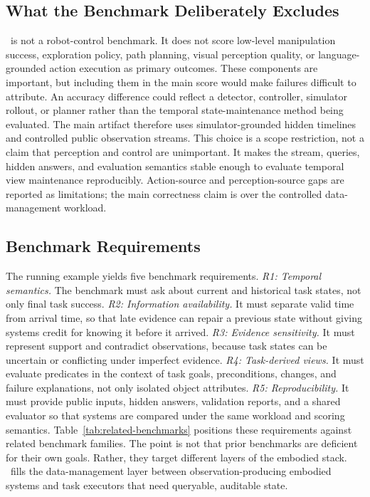 \subsection{What the Benchmark Deliberately Excludes}

\bench\ is not a robot-control benchmark. It does not score low-level manipulation success, exploration policy, path planning, visual perception quality, or language-grounded action execution as primary outcomes. These components are important, but including them in the main score would make failures difficult to attribute. An accuracy difference could reflect a detector, controller, simulator rollout, or planner rather than the temporal state-maintenance method being evaluated.
The main artifact therefore uses simulator-grounded hidden timelines and controlled public observation streams. This choice is a scope restriction, not a claim that perception and control are unimportant. It makes the stream, queries, hidden answers, and evaluation semantics stable enough to evaluate temporal view maintenance reproducibly. Action-source and perception-source gaps are reported as limitations; the main correctness claim is over the controlled data-management workload.

\subsection{Benchmark Requirements}

The running example yields five benchmark requirements.
\first \emph{R1: Temporal semantics.} The benchmark must ask about current and historical task states, not only final task success.
\second \emph{R2: Information availability.} It must separate valid time from arrival time, so that late evidence can repair a previous state without giving systems credit for knowing it before it arrived.
\third \emph{R3: Evidence sensitivity.} It must represent support and contradict observations, because task states can be uncertain or conflicting under imperfect evidence.
\fourth \emph{R4: Task-derived views.} It must evaluate predicates in the context of task goals, preconditions, changes, and failure explanations, not only isolated object attributes.
\fifth \emph{R5: Reproducibility.} It must provide public inputs, hidden answers, validation reports, and a shared evaluator so that systems are compared under the same workload and scoring semantics.
Table~\ref{tab:related-benchmarks} positions these requirements against related benchmark families. The point is not that prior benchmarks are deficient for their own goals. Rather, they target different layers of the embodied stack. \bench\ fills the data-management layer between observation-producing embodied systems and task executors that need queryable, auditable state.
